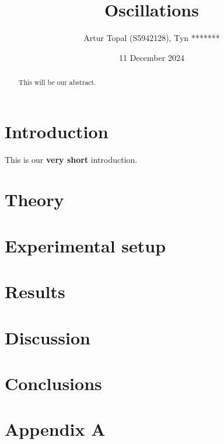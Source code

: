 \documentclass[a4paper,12pt]{article}
\title{Oscillations}
\author{Artur Topal (S5942128), Tyn *******}
\date{11 December 2024}
\begin{document}
\maketitle

\begin{abstract}
This will be our abstract.
\end{abstract}

\section{Introduction}
This is our \textbf{very short} introduction.

\section{Theory}


\section{Experimental setup}


\section{Results}


\section{Discussion}


\section{Conclusions}


\appendix
\section{Appendix A}


\end{document}
